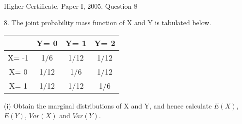 \documentclass[a4paper,12pt]{article}
\begin{document}
Higher Certificate, Paper I, 2005. Question 8

\begin{framed}
8. The joint probability mass function of X and Y is tabulated below.
\begin{center}
\begin{tabular}{|c|c|c|c|}\hline 
   & Y= 0    & Y= 1    & Y= 2        \\ \hline \hline 
X= -1 & 1/6  & 1/12 & 1/12  \\ \hline 
X=  0 & 1/12 & 1/6  & 1/12  \\ \hline 
X=  1 & 1/12 & 1/12 & 1/6  \\ \hline 

\end{tabular}
\end{center}
(i) Obtain the marginal distributions of X and Y, and hence calculate $E(X)$, $E(Y)$,
$Var(X)$ and $Var(Y)$.
\end{framed}


\end{document}

